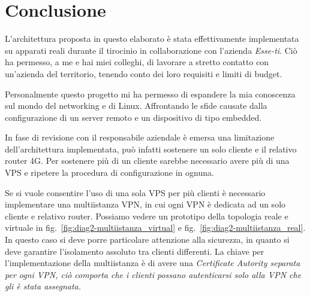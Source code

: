 \chapter{Conclusione \workinprogress}

L'architettura proposta in questo elaborato è stata effettivamente implementata su apparati reali durante il tirocinio in collaborazione con l'azienda \textit{Esse-ti}. Ciò ha permesso, a me e hai miei colleghi, di lavorare a stretto contatto con un'azienda del territorio, tenendo conto dei loro requisiti e limiti di budget.


Personalmente questo progetto mi ha permesso di espandere la mia conoscenza sul mondo del networking e di Linux. Affrontando le sfide causate dalla configurazione di un server remoto e un dispositivo di tipo embedded.


In fase di revisione con il responsabile aziendale è emersa una limitazione dell'architettura implementata, può infatti sostenere un solo cliente e il relativo router 4G. Per sostenere più di un cliente sarebbe necessario avere più di una VPS e ripetere la procedura di configurazione in ognuna. 

Se si vuole consentire l'uso di una sola VPS per più clienti è necessario implementare una multiistanza VPN, in cui ogni VPN è dedicata ad un solo cliente e relativo router. Possiamo vedere un prototipo della topologia reale e virtuale in fig.~\ref{fig:diag2-multiistanza_virtual} e fig.~\ref{fig:diag2-multiistanza_real}. In questo caso si deve porre particolare attenzione alla sicurezza, in quanto si deve garantire l'isolamento assoluto tra clienti differenti. La chiave per l'implementazione della multiistanza è di avere una \it{Certificate Autority} separata per ogni VPN, ciò comporta che i clienti possano autenticarsi solo alla VPN che gli è stata assegnata.


